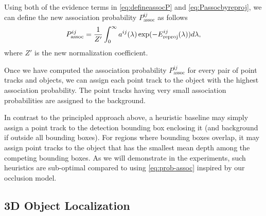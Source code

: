 Using both of the evidence terms in \eqref{eq:defineassocP} and \eqref{eq:Passocbyreproj}, we can define the new association probability $P^{ij}_{\text{assoc}}$ as follows
\begin{align}
  P^{ij}_{\text{assoc}} = \frac{1}{Z'}\int_0^{\infty} a^{ij}(\lambda) \exp(-E^{ij}_{\text{reproj}}(\lambda))d\lambda,
  \label{eq:prob-assoc}
\end{align}
where $Z'$ is the new normalization coefficient.

Once we have computed the association probability $P^{ij}_{\text{assoc}}$ for every pair of point tracks and objects, we can assign each point track to the object with the highest association probability. The point tracks having very small association probabilities are assigned to the background.

In contrast to the principled approach above, a heuristic baseline may simply assign a point track to the detection bounding box enclosing it (and background if outside all bounding boxes). For regions where bounding boxes overlap, it may assign point tracks to the object that has the smallest mean depth among the competing bounding boxes. As we will demonstrate in the experiments, such heuristics are sub-optimal compared to using \eqref{eq:prob-assoc} inspired by our occlusion model.




\subsection{3D Object Localization}
\label{sec:localization}



